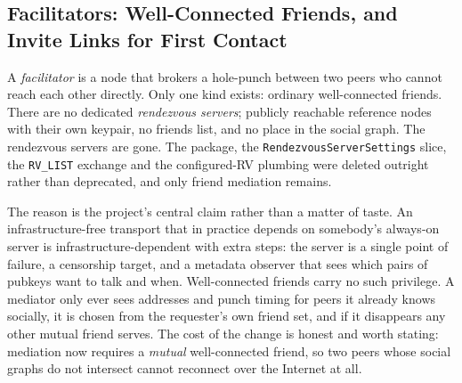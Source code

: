 \documentclass[11pt]{report}
\newcommand{\code}[1]{\texttt{\small #1}}
\begin{document}
\subsection{Facilitators: Well-Connected Friends, and Invite Links for First Contact}

A \emph{facilitator} is a node that brokers a hole-punch between two peers who cannot reach each other directly. Only one kind exists: ordinary well-connected friends. There are no dedicated \emph{rendezvous servers}; publicly reachable reference nodes with their own keypair, no friends list, and no place in the social graph. The rendezvous servers are gone. The package, the \code{RendezvousServerSettings} slice, the \code{RV\_LIST} exchange and the configured-RV plumbing were deleted outright rather than deprecated, and only friend mediation remains.

The reason is the project's central claim rather than a matter of taste. An infrastructure-free transport that in practice depends on somebody's always-on server is infrastructure-dependent with extra steps: the server is a single point of failure, a censorship target, and a metadata observer that sees which pairs of pubkeys want to talk and when. Well-connected friends carry no such privilege. A mediator only ever sees addresses and punch timing for peers it already knows socially, it is chosen from the requester's own friend set, and if it disappears any other mutual friend serves. The cost of the change is honest and worth stating: mediation now requires a \emph{mutual} well-connected friend, so two peers whose social graphs do not intersect cannot reconnect over the Internet at all.
\end{document}
